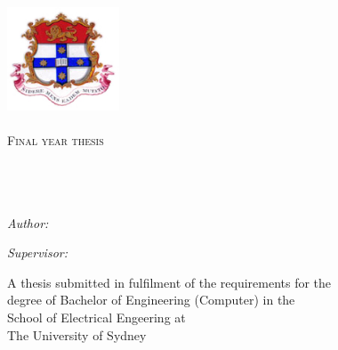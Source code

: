 \documentclass[a4paper]{report}
\title{\thesisTitle{}}
\author{\studentName{}}
\date{\thesisDate{}}
\begin{document}
\begin{titlepage}
\begin{center}

\includegraphics[width=0.25\textwidth]{sydney_uni_coat_of_arms}\\[1cm]

\textsc{\LARGE \universityName{}}\\[1.5cm]

\textsc{\Large Final year thesis}\\[0.5cm]

\HRule \\[0.4cm]
{\huge \bfseries \thesisTitle{}}\\[0.4cm]
\HRule \\[1.5cm]

\begin{minipage}{0.4\textwidth}
    \begin{flushleft} \large
        \emph{Author:}\\
        \studentName{}
    \end{flushleft}
\end{minipage}
\begin{minipage}{0.4\textwidth}
    \begin{flushright} \large
        \emph{Supervisor:} \\
        \supervisorName{}
    \end{flushright}
\end{minipage}

\vfill

{\large A thesis submitted in fulfilment of the requirements for the\\
degree of Bachelor of Engineering (Computer) in the \\
School of Electrical Engeering at\\
The University of Sydney}

\vfill

{\large \thesisDate{}}

\end{center}
\end{titlepage}
\end{document}
